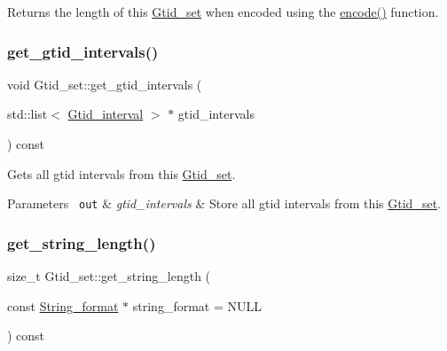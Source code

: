Returns the length of this \mbox{\hyperlink{classGtid__set}{Gtid\+\_\+set}} when encoded using the \mbox{\hyperlink{classGtid__set_a036d17fc704667febec3777422f164cd}{encode()}} function. \mbox{\label{classGtid__set_aa972d694a2c2f8c2b3805cf248ec7d2b}} 
\subsubsection{\texorpdfstring{get\+\_\+gtid\+\_\+intervals()}{get\_gtid\_intervals()}}
{\footnotesize\ttfamily void Gtid\+\_\+set\+::get\+\_\+gtid\+\_\+intervals (\begin{DoxyParamCaption}\item[{std\+::list$<$ \mbox{\hyperlink{structGtid__interval}{Gtid\+\_\+interval}} $>$ $\ast$}]{gtid\+\_\+intervals }\end{DoxyParamCaption}) const}

Gets all gtid intervals from this \mbox{\hyperlink{classGtid__set}{Gtid\+\_\+set}}.


\begin{DoxyParams}[1]{Parameters}
\mbox{\texttt{ out}}  & {\em gtid\+\_\+intervals} & Store all gtid intervals from this \mbox{\hyperlink{classGtid__set}{Gtid\+\_\+set}}. \\
\hline
\end{DoxyParams}
\mbox{\label{classGtid__set_a9183195ad785890b208ce15ce111755b}} 
\subsubsection{\texorpdfstring{get\+\_\+string\+\_\+length()}{get\_string\_length()}}
{\footnotesize\ttfamily size\+\_\+t Gtid\+\_\+set\+::get\+\_\+string\+\_\+length (\begin{DoxyParamCaption}\item[{const \mbox{\hyperlink{structGtid__set_1_1String__format}{String\+\_\+format}} $\ast$}]{string\+\_\+format = {\ttfamily NULL} }\end{DoxyParamCaption}) const}

